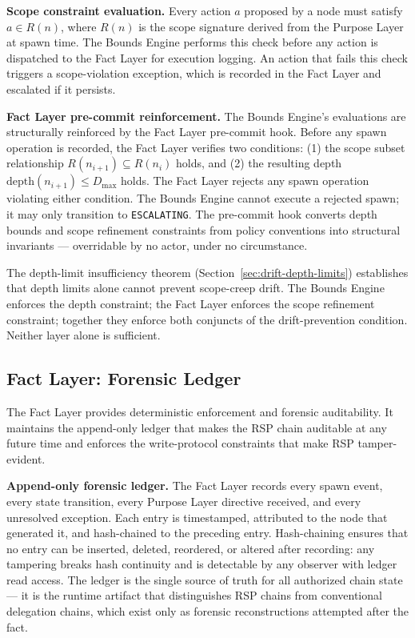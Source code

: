 \medskip
\noindent\textbf{Scope constraint evaluation.} Every action $a$ proposed by a node must satisfy $a \in R(n)$, where $R(n)$ is the scope signature derived from the Purpose Layer at spawn time. The Bounds Engine performs this check before any action is dispatched to the Fact Layer for execution logging. An action that fails this check triggers a scope-violation exception, which is recorded in the Fact Layer and escalated if it persists.

\medskip
\noindent\textbf{Fact Layer pre-commit reinforcement.} The Bounds Engine's evaluations are structurally reinforced by the Fact Layer pre-commit hook. Before any spawn operation is recorded, the Fact Layer verifies two conditions: (1) the scope subset relationship $R(n_{i+1}) \subseteq R(n_i)$ holds, and (2) the resulting depth $\mathrm{depth}(n_{i+1}) \leq D_{\mathrm{max}}$ holds. The Fact Layer rejects any spawn operation violating either condition. The Bounds Engine cannot execute a rejected spawn; it may only transition to \texttt{ESCALATING}. The pre-commit hook converts depth bounds and scope refinement constraints from policy conventions into structural invariants --- overridable by no actor, under no circumstance.

The depth-limit insufficiency theorem (Section~\ref{sec:drift-depth-limits}) establishes that depth limits alone cannot prevent scope-creep drift. The Bounds Engine enforces the depth constraint; the Fact Layer enforces the scope refinement constraint; together they enforce both conjuncts of the drift-prevention condition. Neither layer alone is sufficient.

\subsection{Fact Layer: Forensic Ledger}
\label{sec:rs-fact-ledger}

The Fact Layer provides deterministic enforcement and forensic auditability. It maintains the append-only ledger that makes the RSP chain auditable at any future time and enforces the write-protocol constraints that make RSP tamper-evident.

\medskip
\noindent\textbf{Append-only forensic ledger.} The Fact Layer records every spawn event, every state transition, every Purpose Layer directive received, and every unresolved exception. Each entry is timestamped, attributed to the node that generated it, and hash-chained to the preceding entry. Hash-chaining ensures that no entry can be inserted, deleted, reordered, or altered after recording: any tampering breaks hash continuity and is detectable by any observer with ledger read access. The ledger is the single source of truth for all authorized chain state --- it is the runtime artifact that distinguishes RSP chains from conventional delegation chains, which exist only as forensic reconstructions attempted after the fact.

